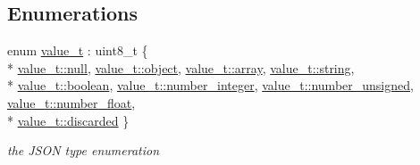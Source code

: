 \subsection*{Enumerations}
\begin{DoxyCompactItemize}
\item 
enum \hyperlink{namespacenlohmann_1_1detail_a90aa5ef615aa8305e9ea20d8a947980f}{value\+\_\+t} \+: uint8\+\_\+t \{ \\*
\hyperlink{namespacenlohmann_1_1detail_a90aa5ef615aa8305e9ea20d8a947980fa37a6259cc0c1dae299a7866489dff0bd}{value\+\_\+t\+::null}, 
\hyperlink{namespacenlohmann_1_1detail_a90aa5ef615aa8305e9ea20d8a947980faa8cfde6331bd59eb2ac96f8911c4b666}{value\+\_\+t\+::object}, 
\hyperlink{namespacenlohmann_1_1detail_a90aa5ef615aa8305e9ea20d8a947980faf1f713c9e000f5d3f280adbd124df4f5}{value\+\_\+t\+::array}, 
\hyperlink{namespacenlohmann_1_1detail_a90aa5ef615aa8305e9ea20d8a947980fab45cffe084dd3d20d928bee85e7b0f21}{value\+\_\+t\+::string}, 
\\*
\hyperlink{namespacenlohmann_1_1detail_a90aa5ef615aa8305e9ea20d8a947980fa84e2c64f38f78ba3ea5c905ab5a2da27}{value\+\_\+t\+::boolean}, 
\hyperlink{namespacenlohmann_1_1detail_a90aa5ef615aa8305e9ea20d8a947980fa5763da164f8659d94a56e29df64b4bcc}{value\+\_\+t\+::number\+\_\+integer}, 
\hyperlink{namespacenlohmann_1_1detail_a90aa5ef615aa8305e9ea20d8a947980fadce7cc8ec29055c4158828921f2f265e}{value\+\_\+t\+::number\+\_\+unsigned}, 
\hyperlink{namespacenlohmann_1_1detail_a90aa5ef615aa8305e9ea20d8a947980fad9966ecb59667235a57b4b999a649eef}{value\+\_\+t\+::number\+\_\+float}, 
\\*
\hyperlink{namespacenlohmann_1_1detail_a90aa5ef615aa8305e9ea20d8a947980fa94708897ec9db8647dfe695714c98e46}{value\+\_\+t\+::discarded}
 \}\begin{DoxyCompactList}\small\item\em the J\+S\+ON type enumeration \end{DoxyCompactList}
\end{DoxyCompactItemize}
